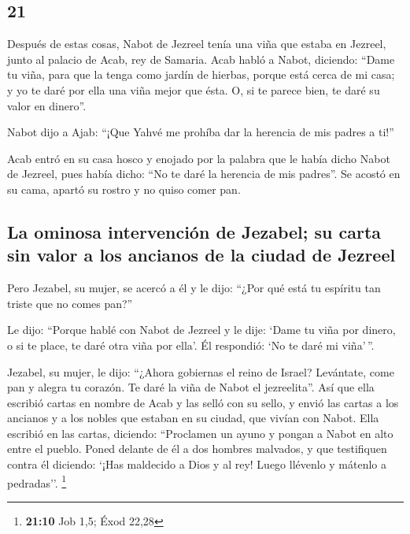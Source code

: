 \begin{paracol}{2}
\hypertarget{section-40}{%
\section{21}\label{section-40}}

 Después de estas cosas, Nabot de Jezreel tenía una viña
que estaba en Jezreel, junto al palacio de Acab, rey de Samaria.
 Acab habló a Nabot, diciendo: ``Dame tu viña, para que la
tenga como jardín de hierbas, porque está cerca de mi casa; y yo te daré
por ella una viña mejor que ésta. O, si te parece bien, te daré su valor
en dinero''.

 Nabot dijo a Ajab: ``¡Que Yahvé me prohíba dar la
herencia de mis padres a ti!''

 Acab entró en su casa hosco y enojado por la palabra que
le había dicho Nabot de Jezreel, pues había dicho: ``No te daré la
herencia de mis padres''. Se acostó en su cama, apartó su rostro y no
quiso comer pan.

\hypertarget{la-ominosa-intervenciuxf3n-de-jezabel-su-carta-sin-valor-a-los-ancianos-de-la-ciudad-de-jezreel}{%
\subsection{La ominosa intervención de Jezabel; su carta sin valor a los
ancianos de la ciudad de
Jezreel}\label{la-ominosa-intervenciuxf3n-de-jezabel-su-carta-sin-valor-a-los-ancianos-de-la-ciudad-de-jezreel}}

 Pero Jezabel, su mujer, se acercó a él y le dijo: ``¿Por
qué está tu espíritu tan triste que no comes pan?''

 Le dijo: ``Porque hablé con Nabot de Jezreel y le dije:
`Dame tu viña por dinero, o si te place, te daré otra viña por ella'. Él
respondió: `No te daré mi viña'\,''.

 Jezabel, su mujer, le dijo: ``¿Ahora gobiernas el reino
de Israel? Levántate, come pan y alegra tu corazón. Te daré la viña de
Nabot el jezreelita''.  Así que ella escribió cartas en
nombre de Acab y las selló con su sello, y envió las cartas a los
ancianos y a los nobles que estaban en su ciudad, que vivían con Nabot.
 Ella escribió en las cartas, diciendo: ``Proclamen un
ayuno y pongan a Nabot en alto entre el pueblo.  Poned
delante de él a dos hombres malvados, y que testifiquen contra él
diciendo: `¡Has maldecido a Dios y al rey! Luego llévenlo y mátenlo a
pedradas''. \footnote{\textbf{21:10} Job 1,5; Éxod 22,28}


\end{paracol}
